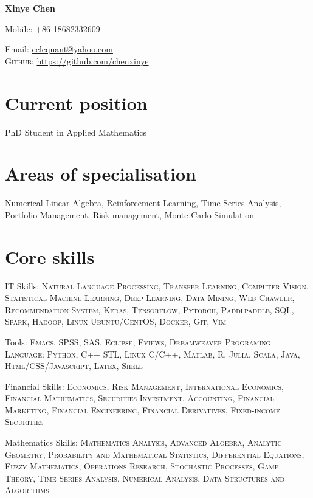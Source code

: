\documentclass[11pt]{article}
\begin{document}
{\LARGE\bfseries Xinye Chen}
\bigskip\bigskip\medskip

\medskip

Mobile: +86 18682332609
\medskip

Email: \href{mailto:cclcquant@yahoo.com}{cclcquant@yahoo.com}\\
\textsc{Github}: \href{https://github.com/chenxinye}{https://github.com/chenxinye}\\ 


\section*{Current position}
PhD Student in Applied Mathematics


\section*{Areas of specialisation}
Numerical Linear Algebra, Reinforcement Learning, Time Series Analysis, Portfolio Management, Risk management, Monte Carlo Simulation


\section*{Core skills}
IT Skills: \textsc{Natural Language Processing, Transfer Learning, Computer Vision, Statistical Machine Learning, Deep Learning, Data Mining, Web Crawler, Recommendation System, Keras, Tensorflow, Pytorch, Paddlpaddle, SQL, Spark, Hadoop, Linux Ubuntu/CentOS, Docker, Git, Vim}

\vspace{0.01\textheight}

Tools: \textsc{Emacs, SPSS, SAS, Eclipse, Eviews, Dreamweaver
	Programing Language: Python, C++ STL, Linux C/C++, Matlab, R, Julia, Scala, Java, Html/CSS/Javascript, Latex, Shell}

\vspace{0.01\textheight}

Financial Skills: \textsc{Economics, Risk Management, International Economics, Financial Mathematics, Securities Investment, Accounting, Financial Marketing, Financial Engineering, Financial Derivatives, Fixed-income Securities}

\vspace{0.01\textheight}

Mathematics Skills: \textsc{Mathematics Analysis, Advanced Algebra, Analytic Geometry, Probability and Mathematical Statistics, Differential Equations, Fuzzy Mathematics, Operations Research, Stochastic Processes, Game Theory, Time Series Analysis, Numerical Analysis, Data Structures and Algorithms}
\end{document}
